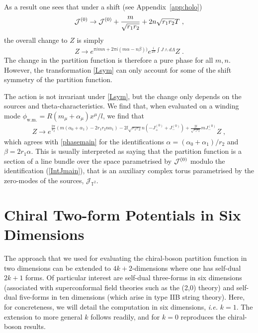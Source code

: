 \documentclass[11pt]{article}
\numberwithin{equation}{section}
\begin{document}
As a result one sees that under a shift (see Appendix~\ref{app:holo})
\begin{align}\label{IntJmain}
{\cal J}^{(0)} \to   {\cal J}^{(0)}  + \frac{m}{\sqrt{r_1r_2}} + 2n\sqrt{r_1r_2}T \ ,
\end{align}
the overall change to $Z$ is simply
\begin{align} \label{phasemain}
    Z \to e^{\pi imn+ 2\pi i (m \alpha-n\beta))}  e^{\frac{i}{2 \pi} \int J \wedge d\Lambda} Z\;.
\end{align}
The change in the partition function is therefore a pure phase for all $m, n$. However, the transformation \eqref{Lsym} can only account for some of the shift symmetry of the partition function.

The action is not invariant under \eqref{Lsym}, but the change only depends on the sources and theta-characteristics.  We find that, when evaluated on  a winding mode $\phi_{\text{w.m.}}=R(m_\mu+\alpha_\mu)x^\mu/l$, we find that 
\begin{align}
Z\to e^{\frac{2\pi}{r_2}(m(\alpha_0+\alpha_1)- 2r_1r_2n\alpha_1)-2l\sqrt{r_1r_2} n(-J_+^{(0)}+J_-^{(0)})+\frac{2l}{\sqrt{r_1r_2}} m J_-^{(0)}} Z \;,
\end{align}
which agrees with \eqref{phasemain} for the identifications $\alpha = (\alpha_0 + \alpha_1)/r_2$ and $\beta = 2 r_1 \alpha$. This is usually interpreted as saying that the partition function is a section of a line bundle over the space parametrised by ${\cal J}^{(0)} $ modulo the identification (\ref{IntJmain}), that is an auxiliary complex torus parametrised by the zero-modes of the sources, $\mathcal J_{\mathbb T^2}$.

\section{Chiral Two-form Potentials in Six Dimensions}\label{6DPI}

The approach that we used for evaluating the chiral-boson partition function in two dimensions can be extended to $4k+2$-dimensions where one has self-dual $2k+1$ forms. Of particular interest are self-dual three-forms in six dimensions (associated with superconformal field theories such as the (2,0) theory) and self-dual five-forms in ten dimensions (which arise in type IIB string theory). Here, for concreteness,  we will detail the computation in six dimensions, {\it i.e.} $k=1$. The extension to more general $k$ follows readily, and for $k=0$ reproduces the chiral-boson results. 
\end{document}
